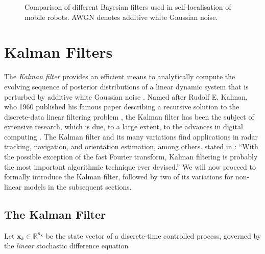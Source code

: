 \begin{figure}[t]
\begin{center}
\end{center}
\caption[Comparison of different Bayesian filters used in self-localisation of mobile robots.]{Comparison of different Bayesian filters used in self-localisation of mobile robots. AWGN denotes additive white Gaussian noise.}
\label{fig:filter_overview}
\end{figure}


\section{Kalman Filters}

The \emph{Kalman filter} provides an efficient means to analytically compute the evolving sequence of posterior distributions of a linear dynamic system that is perturbed by additive white Gaussian noise \cite{maybeck2002stochastic}. Named after Rudolf E. Kalman, who 1960 published his famous paper describing a recursive solution to the discrete-data linear filtering problem \cite{kalman_1960}, the Kalman filter has been the subject of extensive research, which is due, to a large extent, to the advances in digital computing \cite{welch2014}. The Kalman filter and its many variations find applications in radar tracking, navigation, and orientation estimation, among others. \citeauthor{zarchan2009fundamentals} stated in \cite{zarchan2009fundamentals}: ``With the possible exception of the fast Fourier transform, Kalman filtering is probably the most important algorithmic technique ever devised.'' We will now proceed to formally introduce the Kalman filter, followed by two of its variations for non-linear models in the subsequent sections.

\subsection{The Kalman Filter}\label{sec:Kalman}

Let $\bm{x}_k \in \mathbb{R}^{n_{\bm{x}}}$ be the state vector of a discrete-time controlled process, governed by the \emph{linear} stochastic difference equation 

